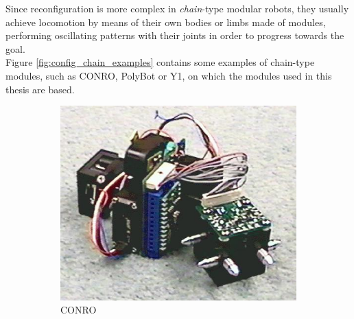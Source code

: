 Since reconfiguration is more complex in \emph{chain}-type modular robots, they usually achieve locomotion by means of their own bodies or limbs made of modules, performing oscillating patterns with their joints in order to progress towards the goal.\\

Figure \ref{fig:config_chain_examples} contains some examples of chain-type modules, such as CONRO, PolyBot or Y1, on which the modules used in this thesis are based.\\

\begin{figure}[b]
		\centering
        \begin{subfigure}[b]{0.25\textwidth}
                \centering
                \includegraphics[width=\textwidth]{images/CONRO01.jpg}
                \caption{CONRO}
                \label{fig:CONRO}
        \end{subfigure}
        ~
        \begin{subfigure}[b]{0.18\textwidth}
                \centering

\end{subfigure}
\end{figure}
